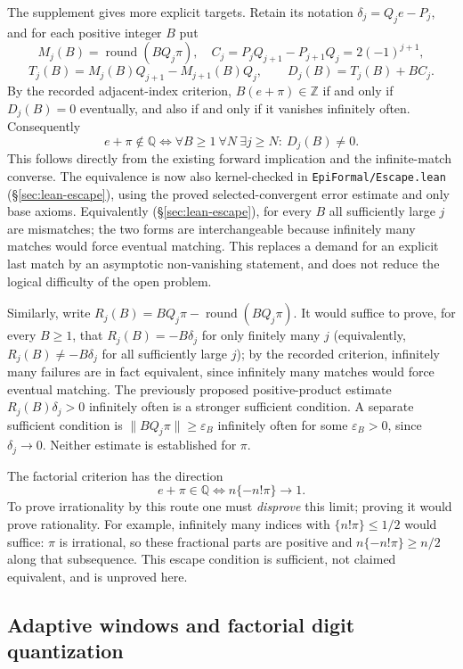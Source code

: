 \documentclass[11pt]{amsart}
\theoremstyle{definition}
\theoremstyle{remark}
\numberwithin{equation}{section}
\newcommand{\Q}{\mathbb{Q}}
\newcommand{\Z}{\mathbb{Z}}
\begin{document}
The supplement gives more explicit targets. Retain its notation $\delta_j=Q_je-P_j$, and for each positive integer $B$ put
\[
M_j(B)=\operatorname{round}(BQ_j\pi),\quad
C_j=P_jQ_{j+1}-P_{j+1}Q_j=2(-1)^{j+1},
\]
\[
T_j(B)=M_j(B)Q_{j+1}-M_{j+1}(B)Q_j,\qquad
D_j(B)=T_j(B)+BC_j.
\]
By the recorded adjacent-index criterion, $B(e+\pi)\in\Z$ if and only if $D_j(B)=0$ eventually, and also if and only if it vanishes infinitely often. Consequently
\[
e+\pi\notin\Q
\iff \forall B\ge1\ \forall N\ \exists j\ge N:\ D_j(B)\ne0.
\]
This follows directly from the existing forward implication and the infinite-match converse. The equivalence is now also kernel-checked in \texttt{EpiFormal/\allowbreak{}Escape.lean} (\S\ref{sec:lean-escape}), using the proved selected-convergent error estimate and only base axioms. Equivalently (\S\ref{sec:lean-escape}), for every $B$ all sufficiently large $j$ are mismatches; the two forms are interchangeable because infinitely many matches would force eventual matching. This replaces a demand for an explicit last match by an asymptotic non-vanishing statement, and does not reduce the logical difficulty of the open problem.

Similarly, write $R_j(B)=BQ_j\pi-\operatorname{round}(BQ_j\pi)$. It would suffice to prove, for every $B\ge1$, that $R_j(B)=-B\delta_j$ for only finitely many $j$ (equivalently, $R_j(B)\ne-B\delta_j$ for all sufficiently large $j$); by the recorded criterion, infinitely many failures are in fact equivalent, since infinitely many matches would force eventual matching. The previously proposed positive-product estimate $R_j(B)\delta_j>0$ infinitely often is a stronger sufficient condition. A separate sufficient condition is $\|BQ_j\pi\|\ge\varepsilon_B$ infinitely often for some $\varepsilon_B>0$, since $\delta_j\to0$. Neither estimate is established for $\pi$.

The factorial criterion has the direction
\[
e+\pi\in\Q\iff n\{-n!\pi\}\longrightarrow1.
\]
To prove irrationality by this route one must \emph{disprove} this limit; proving it would prove rationality. For example, infinitely many indices with $\{n!\pi\}\le1/2$ would suffice: $\pi$ is irrational, so these fractional parts are positive and $n\{-n!\pi\}\ge n/2$ along that subsequence. This escape condition is sufficient, not claimed equivalent, and is unproved here.

\subsection{Adaptive windows and factorial digit quantization}
\end{document}
